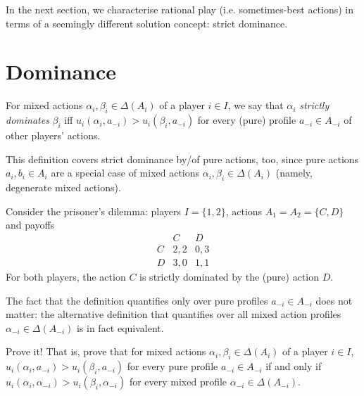 In the next section, we characterise rational play (i.e. sometimes-best actions) in terms of a seemingly different solution concept: strict dominance.



\section{Dominance}
\label{dom:dom}

\begin{definition}
	\label{definition:dominates}
	For mixed actions $\alpha_i,\beta_i \in \Delta(A_i)$ of a player $i \in I$, we say that $\alpha_i$ \emph{strictly dominates} $\beta_i$ iff $u_i(\alpha_i,a_{-i}) > u_i(\beta_i,a_{-i})$ for every (pure) profile $a_{-i} \in A_{-i}$ of other players' actions.
\end{definition}

This definition covers strict dominance by/of pure actions, too, since pure actions $a_i,b_i \in A_i$ are a special case of mixed actions $\alpha_i,\beta_i \in \Delta(A_i)$ (namely, degenerate mixed actions).

\begin{example}
	\label{example:prisoners}
	Consider the prisoner's dilemma: players $I=\{1,2\}$, actions $A_1=A_2=\{C,D\}$ and payoffs
	\begin{equation*}
		\begin{array}{c|ccc}
			  & C   & D   \\ \hline
			C & 2,2 & 0,3 \\
			D & 3,0 & 1,1
		\end{array}
	\end{equation*}
	For both players, the action $C$ is strictly dominated by the (pure) action $D$.
\end{example}

The fact that the definition quantifies only over pure profiles $a_{-i} \in A_{-i}$ does not matter: the alternative definition that quantifies over all mixed action profiles $\alpha_{-i} \in \Delta(A_{-i})$ is in fact equivalent.

\begin{exercise}[easy]
	\label{exercise:dominates_others_mixed}
	Prove it! That is, prove that for mixed actions $\alpha_i,\beta_i \in \Delta(A_i)$ of a player $i \in I$, $u_i(\alpha_i,a_{-i}) > u_i(\beta_i,a_{-i})$ for every pure profile $a_{-i} \in A_{-i}$ if and only if $u_i(\alpha_i,\alpha_{-i}) > u_i(\beta_i,\alpha_{-i})$ for every mixed profile $\alpha_{-i} \in \Delta(A_{-i})$.
\end{exercise}

